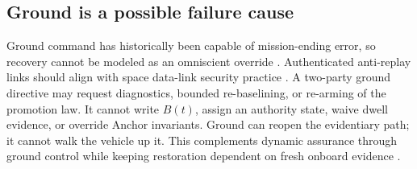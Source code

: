 \subsection{Ground is a possible failure cause}
Ground command has historically been capable of mission-ending error, so recovery cannot be modeled as an omniscient override \cite{SagdeevZakharov1989}. Authenticated anti-replay links should align with space data-link security practice \cite{CCSDS355_0_B_2,CCSDS355_1_B_1}. A two-party ground directive may request diagnostics, bounded re-baselining, or re-arming of the promotion law. It cannot write $B(t)$, assign an authority state, waive dwell evidence, or override Anchor invariants. Ground can reopen the evidentiary path; it cannot walk the vehicle up it. This complements dynamic assurance through ground control while keeping restoration dependent on fresh onboard evidence \cite{Sljivo2024}.
